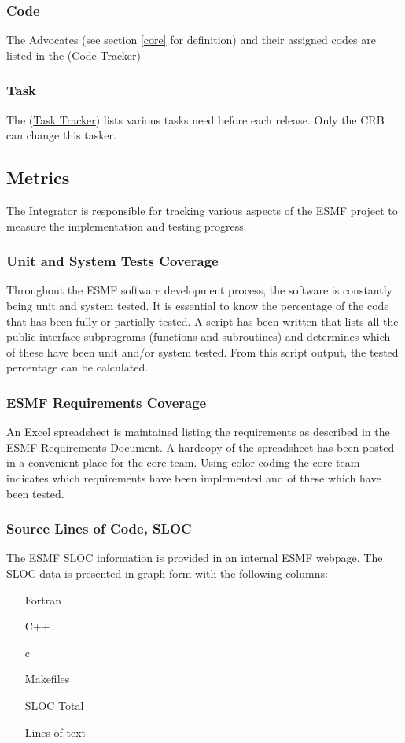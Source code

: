 \subsubsection{Code}
The Advocates (see section \autoref{core} for definition) and their assigned codes are listed
in the (\href{http://sourceforge.net/tracker/?group_id=38089\&atid=421189}{Code Tracker})

\subsubsection{Task}
The (\href{http://sourceforge.net/tracker/?group_id=38089}{Task Tracker}) lists various tasks need before each release. Only the CRB can change this tasker. 


\subsection{Metrics}

The Integrator is responsible for tracking various aspects of the
ESMF project to measure the implementation and testing progress.
\subsubsection{Unit and System Tests Coverage}
Throughout the ESMF software development process, the software is constantly
being unit and system tested. It is essential to know the percentage of the
code that has been fully or partially tested. A script has been written that 
lists all the public interface subprograms (functions and subroutines) and 
determines which of these have been unit and/or system tested. From this script
output, the tested percentage can be calculated.
\subsubsection{ESMF Requirements Coverage}
An Excel spreadsheet is maintained listing the requirements as described in the
ESMF Requirements Document. A hardcopy of the spreadsheet has been posted in a
convenient place for the core team. Using color coding the core team indicates
which requirements have been implemented and of these which have been tested.
\subsubsection{Source Lines of Code, SLOC}
The ESMF SLOC information is provided in an internal ESMF webpage. The
SLOC data is presented in graph form with the following columns:
\begin{enumerate}
\item[Fortran] 
\item[C++] 
\item[c] 
\item[Makefiles] 
\item[SLOC Total] 
\item[Lines of text] 
\end{enumerate}

